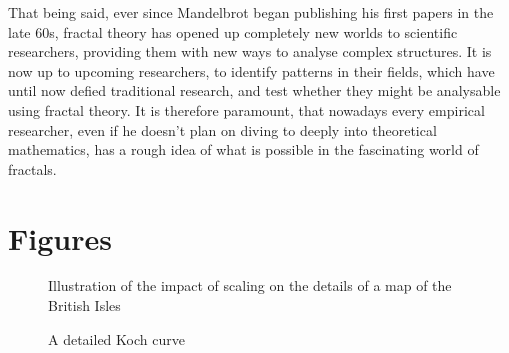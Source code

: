 \documentclass{article}[12pt]
\begin{document}
That being said, ever since Mandelbrot began publishing his first papers in the late 60s, fractal theory has opened up completely new worlds to scientific researchers, providing them with new ways to analyse complex structures. It is now up to upcoming researchers, to identify patterns in their fields, which have until now defied traditional research, and test whether they might be analysable using fractal theory. It is therefore paramount, that nowadays every empirical researcher, even if he doesn't plan on diving to deeply into theoretical mathematics, has a rough idea of what is possible in the fascinating world of fractals.


\clearpage
\section{Figures}

\begin{figure}[!h]
    \centering
    \qquad
    \caption{Illustration of the impact of scaling on the details of a map of the British Isles}%
    \label{fig:brit}%
\end{figure}

\begin{figure}
 \centering
  \caption{A detailed Koch curve}
  \label{fig:koch}%
\end{figure}
\end{document}
